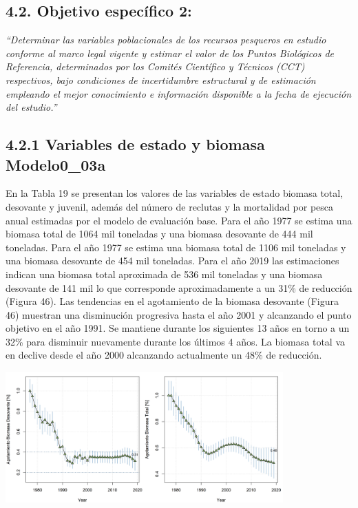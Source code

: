 \documentclass[
  spanish,
]{article}
\begin{document}
\hypertarget{objetivo-especuxedfico-2-1}{%
\subsection{4.2. Objetivo específico
2:}\label{objetivo-especuxedfico-2-1}}

\emph{``Determinar las variables poblacionales de los recursos pesqueros
en estudio conforme al marco legal vigente y estimar el valor de los
Puntos Biológicos de Referencia, determinados por los Comités Científico
y Técnicos (CCT) respectivos, bajo condiciones de incertidumbre
estructural y de estimación empleando el mejor conocimiento e
información disponible a la fecha de ejecución del estudio.''}

\hypertarget{variables-de-estado-y-biomasa-modelo0_03a}{%
\subsection{4.2.1 Variables de estado y biomasa
Modelo0\_03a}\label{variables-de-estado-y-biomasa-modelo0_03a}}

En la Tabla 19 se presentan los valores de las variables de estado
biomasa total, desovante y juvenil, además del número de reclutas y la
mortalidad por pesca anual estimadas por el modelo de evaluación base.
Para el año 1977 se estima una biomasa total de 1064 mil toneladas y una
biomasa desovante de 444 mil toneladas. Para el año 1977 se estima una
biomasa total de 1106 mil toneladas y una biomasa desovante de 454 mil
toneladas. Para el año 2019 las estimaciones indican una biomasa total
aproximada de 536 mil toneladas y una biomasa desovante de 141 mil lo
que corresponde aproximadamente a un 31\% de reducción (Figura 46). Las
tendencias en el agotamiento de la biomasa desovante (Figura 46)
muestran una disminución progresiva hasta el año 2001 y alcanzando el
punto objetivo en el año 1991. Se mantiene durante los siguientes 13
años en torno a un 32\% para disminuir nuevamente durante los últimos 4
años. La biomasa total va en declive desde el año 2000 alcanzando
actualmente un 48\% de reducción.

\begin{center}
\includegraphics[width=0.8\textwidth]{Figuras/depletion.SB_BT.png}
\end{center}
\end{document}
